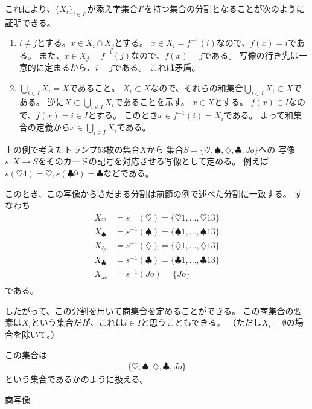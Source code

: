 これにより、$\{X_i\}_{i\in I'}$が添え字集合$I'$を持つ集合の分割となることが次のように証明できる。
\begin{enumerate}
\item
  $i\neq j$とする。$x\in X_i\cap X_j$とする。
  $x\in X_i=f^{-1}(i)$なので、$f(x)=i$である。
  また、$x\in X_j=f^{-1}(j)$なので、$f(x)=j$である。
  写像の行き先は一意的に定まるから、$i=j$である。
  これは矛盾。
\item
  $\bigcup_{i\in I}X_i=X$であること。
  $X_i\subset X$なので、それらの和集合$\bigcup_{i\in I}X_i\subset X$である。
  逆に$X\subset \bigcup_{i\in I}X_i$であることを示す。
  $x\in X$とする。
  $f(x)\in I$なので、$f(x)=i\in I$とする。
  このとき$x\in f^{-1}(i)=X_i$である。
  よって和集合の定義から$x\in\bigcup_{i\in I}X_i$である。
\end{enumerate}


\begin{eg}
  上の例で考えたトランプ$53$枚の集合$X$から
  集合$S=\{\heartsuit,\spadesuit,\diamondsuit,\clubsuit,Jo\}$への
  写像$s:X\to S$をそのカードの記号を対応させる写像として定める。
  例えば$s(\heartsuit4)=\heartsuit, s(\clubsuit9)=\clubsuit$などである。

  このとき、この写像からさだまる分割は前節の例で述べた分割に一致する。
  すなわち
  \begin{align*}
    X_\heartsuit&=s^{-1}(\heartsuit)=\{\heartsuit1,\ldots,\heartsuit13\}\\
    X_\spadesuit&=s^{-1}(\spadesuit)=\{\spadesuit1,\ldots,\spadesuit13\}\\
    X_\diamondsuit&=s^{-1}(\diamondsuit)=\{\diamondsuit1,\ldots,\diamondsuit13\}\\
    X_\clubsuit&=s^{-1}(\clubsuit)=\{\clubsuit1,\ldots,\clubsuit13\}\\
    X_{Jo}&=s^{-1}(Jo)=\{Jo\}\\
  \end{align*}
  である。
\end{eg}

したがって、この分割を用いて商集合を定めることができる。
この商集合の要素は$X_i$という集合だが、これは$i\in I$と思うこともできる。
（ただし$X_i=\emptyset$の場合を除いて。）

\begin{eg}
  この集合は
  \begin{align*}
    \{\heartsuit,\spadesuit,\diamondsuit,\clubsuit,Jo\}
  \end{align*}
  という集合であるかのように扱える。

  商写像
\end{eg}

